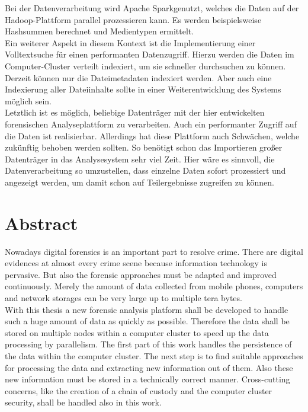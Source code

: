 \noindent
Bei der Datenverarbeitung wird Apache Spark\texttrademark\thinspace genutzt, welches die Daten auf der Hadoop-Plattform parallel prozessieren kann. Es werden beispielsweise Hashsummen berechnet und Medientypen ermittelt.\\
Ein weiterer Aspekt in diesem Kontext ist die Implementierung einer Volltextsuche für einen performanten Datenzugriff. Hierzu werden die Daten im Computer-Cluster verteilt indexiert, um sie schneller durchsuchen zu können. Derzeit können nur die Dateimetadaten indexiert werden. Aber auch eine Indexierung aller Dateiinhalte sollte in einer Weiterentwicklung des Systems möglich sein.\\

\noindent
Letztlich ist es möglich, beliebige Datenträger mit der hier entwickelten forensischen Analyseplattform zu verarbeiten. Auch ein performanter Zugriff auf die Daten ist realisierbar. Allerdings hat diese Plattform auch Schwächen, welche zukünftig behoben werden sollten. So benötigt schon das Importieren großer Datenträger in das Analysesystem sehr viel Zeit. Hier wäre es sinnvoll, die Datenverarbeitung so umzustellen, dass einzelne Daten sofort prozessiert und angezeigt werden, um damit schon auf Teilergebnisse zugreifen zu können.


\newpage
\section*{Abstract}
Nowadays digital forensics is an important part to resolve crime. There are digital evidences at almost every crime scene because information technology is pervasive. But also the forensic approaches must be adapted and improved continuously. Merely the amount of data collected from mobile phones, computers and network storages  can be very large up to multiple tera bytes.\\

\noindent
With this thesis a new forensic analysis platform shall be developed to handle such a huge amount of data as quickly as possible. Therefore the data shall be stored on multiple nodes within a computer cluster to speed up the data processing by parallelism. The first part of this work handles the persistence of the data within the computer cluster. The next step is to find suitable approaches for processing the data and extracting new information out of them. Also these new information must be stored in a technically correct manner. Cross-cutting concerns, like the creation of a chain of custody and the computer cluster security, shall be handled also in this work.\\

